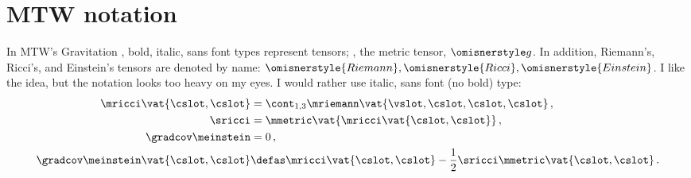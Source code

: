 \section{MTW notation} %
\label{sec:mtw_notation}
%
In MTW's Gravitation \cite{misner1973}, bold, italic, sans font types represent tensors; \eg, the metric tensor, $\omisnerstyle g$. In addition, Riemann's, Ricci's, and Einstein's tensors are denoted by name: $\omisnerstyle{Riemann},\omisnerstyle{Ricci},\omisnerstyle{Einstein}$. I like the idea, but the notation looks too heavy on my eyes. I would rather use italic, sans font (no bold) type:
%
\begin{align*}
  \mricci\vat{\cslot,\cslot} &= \cont_{1,3}\mriemann\vat{\vslot,\cslot,\cslot,\cslot}\,,\quad \\
  \sricci &= \mmetric\vat{\mricci\vat{\cslot,\cslot}}\,,\quad \\
  \gradcov\meinstein &= 0\,,\\
  \gradcov\meinstein\vat{\cslot,\cslot} &\defas \mricci\vat{\cslot,\cslot}
    - \dfrac 12\sricci\mmetric\vat{\cslot,\cslot}\,.
\end{align*}
%
